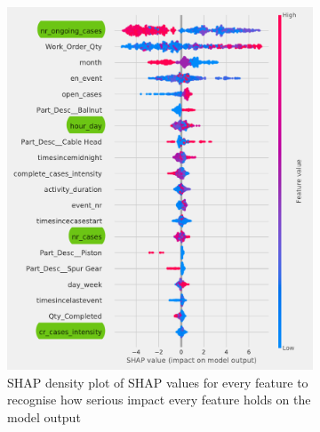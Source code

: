 \begin{figure}[!htbp] %
	\caption[SHAP density plot product]{SHAP density plot of}
	\label{fig:shap1}
	\begin{subfigure}{0.48\textwidth}
		\includegraphics[width=\linewidth]{images/shap/summary_plot.pdf}
		\caption[SHAP density plot]{SHAP density plot of SHAP values for every feature to recognise how serious impact every feature holds on the model output}
	 \label{fig:SHAP11}
	\end{subfigure}\hspace*{\fill}
	\begin{subfigure}{0.48\textwidth}

\end{subfigure}
\end{figure}

